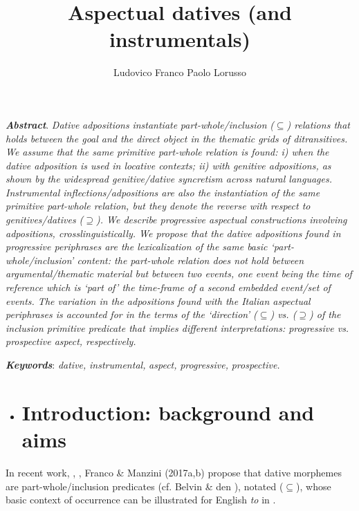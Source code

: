 \documentclass[output=paper]{langsci/langscibook}
\author{Ludovico Franco\affiliation{}\lastand 
Paolo Lorusso\affiliation{}}
\title{Aspectual datives (and instrumentals)}
\begin{document}
 

\textbf{\textit{Abstract}}. \textit{Dative} \textit{adpositions}\textbf{ }\textit{instantiate} \textit{part-whole/inclusion} \textit{(${\subseteq}$) relations that holds between the goal and the direct object in the thematic grids of ditransitives. We assume that the same primitive part-whole relation is found: i) when the dative adposition is used in locative contexts; ii) with genitive adpositions, as shown by the widespread genitive/dative syncretism across natural languages. Instrumental inflections/adpositions are also the instantiation of the same primitive part-whole relation, but they denote the reverse with respect to genitives/datives (${\supseteq}$). We describe progressive aspectual constructions involving adpositions, crosslinguistically. We propose that the dative adpositions found in progressive periphrases are the lexicalization of the same basic ‘part-whole/inclusion’ content: the part-whole relation does not hold between argumental/thematic material but between two events, one event being the time of reference which is ‘part of’ the time-frame of a second embedded event/set of events. The variation in the adpositions found with the Italian aspectual periphrases is accounted for in the terms of the ‘direction’ (${\subseteq}$) vs. (${\supseteq}$) of the inclusion primitive predicate that implies different interpretations:  progressive vs. prospective aspect, respectively.} 

\textbf{\textit{Keywords}}: \textit{dative,} \textit{instrumental,} \textit{aspect,} \textit{progressive,} \textit{prospective.}

\begin{itemize}
\item \section{Introduction: background and aims}
\end{itemize}

In recent work, \citet{ManziniSavoia2011}, \citet{ManziniFranco2016}, Franco \& Manzini (2017a,b) propose that dative morphemes are part-whole/inclusion predicates (cf. Belvin \& den \citealt{Dikken1997}), notated (${\subseteq}$), whose basic context of occurrence can be illustrated for English \textit{to} in .

\ea%
    \label{ex:key:1}
    \gll\\
        \\
    \glt
    \z
\end{document}
